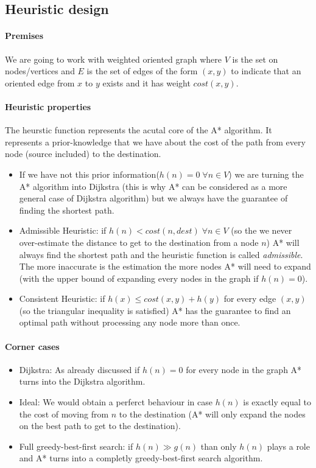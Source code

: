 \documentclass[twocolumn, switch]{article} %
\begin{document}
\subsection{Heuristic design}
\paragraph{Premises} We are going to work with weighted oriented graph where $V$ is the set on nodes/vertices
and $E$ is the set of edges of the form $(x,y)$ to indicate that an oriented edge from $x$ to $y$ exists and it
has weight $cost(x, y)$.
\paragraph{Heuristic properties} 
The heurstic function represents the acutal core of the A* algorithm. It represents a prior-knowledge that
we have about the cost of the path from every node (source included) to the destination. 
\begin{itemize}
  \item If we have not this prior information($h(n) = 0 \;\forall n \in V$) we are turning the A* algorithm into
        Dijkstra (this is why A* can be considered as a more general case of Dijkstra algorithm) but we always
        have the guarantee of finding the shortest path. 
  \item Admissible Heuristic: if $h(n) < cost(n, dest) \;\forall n \in V$ (so the we never over-estimate the distance to
        get to the destination from a node $n$) A* will always find the shortest path and the heuristic
        function is called \textit{admissible}. The more inaccurate
        is the estimation the more nodes A* will need to expand (with the upper bound of expanding every
        nodes in the graph if $h(n) = 0$).
  \item Consistent Heuristic: if $h(x) \le cost(x, y) + h(y)$ for every edge $(x, y)$ (so the triangular
        inequality is satisfied) A* has the guarantee to find an optimal path without processing
        any node more than once. 
\end{itemize}
\paragraph{Corner cases} 
\begin{itemize}
  \item Dijkstra: As already discussed if $h(n)=0$ for every node in the graph A* turns into the Dijkstra algorithm.
  \item Ideal: We would obtain a perferct behaviour in case $h(n)$ is exactly equal to the cost of moving from $n$ to
  the destination (A* will only expand the nodes on the best path to get to the destination).
  \item Full greedy-best-first search: if $h(n) \gg g(n)$ than only $h(n)$ plays a role and A* turns into
        a completly greedy-best-first search algorithm.
\end{itemize}
\end{document}
